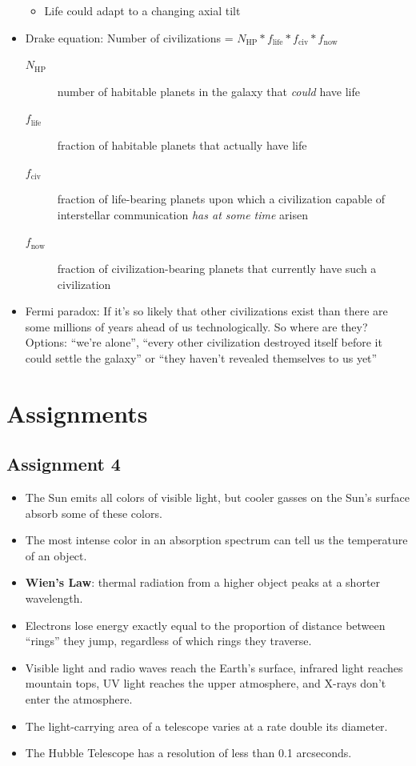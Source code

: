 \documentclass[12pt]{article}
\begin{document}
\begin{itemize}
\begin{itemize}
\item Life could adapt to a changing axial tilt
\end{itemize}
\item Drake equation: Number of civilizations = $N_\text{HP} * f_\text{life} * f_\text{civ} * f_\text{now}$
\begin{description}
\item[$N_\text{HP}$] number of habitable planets in the galaxy that \emph{could} have life
\item[$f_\text{life}$] fraction of habitable planets that actually have life
\item[$f_\text{civ}$] fraction of life-bearing planets upon which a civilization capable of interstellar communication \emph{has at some time} arisen
\item[$f_\text{now}$] fraction of civilization-bearing planets that currently have such a civilization
\end{description}
\item Fermi paradox: If it's so likely that other civilizations exist than there are some millions of years ahead of us technologically.  So where are they?  Options: ``we're alone'', ``every other civilization destroyed itself before it could settle the galaxy'' or ``they haven't revealed themselves to us yet''
\end{itemize}


\section{Assignments}
\subsection{Assignment 4}
\begin{itemize}
\item The Sun emits all colors of visible light, but cooler gasses on the Sun's surface absorb some of these colors.
\item The most intense color in an absorption spectrum can tell us the temperature of an object.
\item {\bf Wien's Law}: thermal radiation from a higher object peaks at a shorter wavelength.
\item Electrons lose energy exactly equal to the proportion of distance between ``rings'' they jump, regardless of which rings they traverse.
\item Visible light and radio waves reach the Earth's surface, infrared light reaches mountain tops, UV light reaches the upper atmosphere, and X-rays don't enter the atmosphere.
\item The light-carrying area of a telescope varies at a rate double its diameter.
\item The Hubble Telescope has a resolution of less than 0.1 arcseconds.
\end{itemize}
\end{document}
